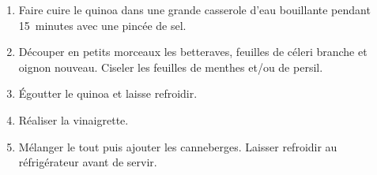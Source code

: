 

\begin{ingredients}
\end{ingredients}


\begin{ingredients}
\end{ingredients}


\begin{recipe}
  \begin{enumerate}

  \item Faire cuire le quinoa dans une grande casserole d'eau
    bouillante pendant 15~minutes avec une pincée de sel.

  \item Découper en petits morceaux les betteraves, feuilles de céleri
    branche et oignon nouveau.  Ciseler les feuilles de menthes et/ou
    de persil.

  \item Égoutter le quinoa et laisse refroidir.

  \item Réaliser la vinaigrette.

  \item Mélanger le tout puis ajouter les canneberges.  Laisser
    refroidir au réfrigérateur avant de servir.

  \end{enumerate}
\end{recipe}

